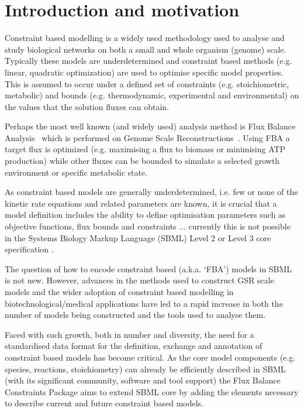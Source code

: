 
\section{ Introduction and motivation }
\label{intro}

Constraint based modelling is a widely used methodology used to analyse and study biological networks on both a small and whole organism (genome) scale. Typically these models are underdetermined and constraint based methods (e.g. linear, quadratic optimization) are used to optimise specific model properties. This is assumed to occur under a defined set of constraints (e.g. stoichiometric, metabolic) and bounds (e.g. thermodynamic, experimental and environmental) on the values that the solution fluxes can obtain.

Perhaps the most well known (and widely used) analysis method is Flux Balance Analysis~\citep[FBA; ][]{orth_2010} which is performed on Genome Scale Reconstructions~\citep[GSR's; ][]{oberhardt_2009}. Using FBA a target flux is optimized (e.g. maximising a flux to biomass or minimising ATP production) while other fluxes can be bounded to simulate a selected growth environment or specific metabolic state.

As constraint based models are generally underdetermined, i.e. few or none of the kinetic rate equations and related parameters are known, it is crucial that a model definition includes the ability to define optimisation parameters such as objective functions, flux bounds and constraints ... currently this is not possible in the Systems Biology Markup Language (SBML) Level 2 or Level 3 core specification \citep{sbml, sbml3core}.

The question of how to encode constraint based (a.k.a. `FBA') models in SBML is not new. However, advances in the methods used to construct GSR scale models and the wider adoption of constraint based modelling in biotechnological/medical applications have led to a rapid increase in both the number of models being constructed and the tools used to analyse them.

Faced with such growth, both in number and diversity, the need for a standardised data format for the definition, exchange and annotation of constraint based models has become critical. As the core model components (e.g. species, reactions, stoichiometry) can already be efficiently described in SBML (with its significant community, software and tool support) the Flux Balance Constraints Package aims to extend SBML core by adding the elements necessary to describe current and future constraint based models.


